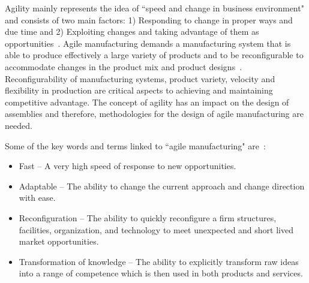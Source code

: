 
Agility mainly represents the idea of ``speed and change in business environment" and consists of two main factors: 1) Responding to change in proper ways and due time and 2) Exploiting changes and taking advantage of them as opportunities~\cite{SHARIFI.1999}. Agile manufacturing demands a manufacturing system that is able to produce effectively a large variety of products and to be reconfigurable to accommodate changes in the product mix and product designs~\cite{GUNASEKARAN.1999}. Reconfigurability of manufacturing systems, product variety, velocity and flexibility in production are critical aspects to achieving and maintaining competitive advantage. The concept of agility has an impact on the design of assemblies and therefore, methodologies for the design of agile manufacturing are needed.

Some of the key words and terms linked to ``agile manufacturing" are~\cite{KIDD.2000}:
\begin{itemize}
\item Fast -- A very high speed of response to new opportunities.
\item Adaptable -- The ability to change the current approach and change direction with ease.
\item Reconfiguration -- The ability to quickly reconfigure a firm structures, facilities, organization, and technology to meet unexpected and short lived market opportunities.
\item Transformation of knowledge -- The ability to explicitly transform raw ideas into a range of competence which is then used in both products and services.
\end{itemize}

